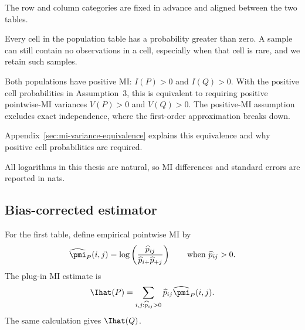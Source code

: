 \begin{assumption}
The row and column categories are fixed in advance and aligned between the two
tables.
\end{assumption}

\begin{assumption}
Every cell in the population table has a probability greater than zero. A
sample can still contain no observations in a cell, especially when that cell
is rare, and we retain such samples.
\end{assumption}

\begin{assumption}[Positive MI]
Both populations have positive MI: \(I(P)>0\) and \(I(Q)>0\). With the positive
cell probabilities in Assumption~3, this is equivalent to requiring positive
pointwise-MI variances \(V(P)>0\) and \(V(Q)>0\). The positive-MI
assumption excludes exact independence, where the first-order approximation
breaks down.
\end{assumption}

Appendix~\ref{sec:mi-variance-equivalence} explains this equivalence and
why positive cell probabilities are required.

All logarithms in this thesis are natural, so MI differences and standard
errors are reported in nats.

\subsection{Bias-corrected estimator}

For the first table, define empirical pointwise MI by
\begin{equation}
  \widehat\pmi_P(i,j)
  =\log\left(
  \frac{\widehat p_{ij}}
       {\widehat p_{i+}\widehat p_{+j}}
  \right)
  \qquad\text{when }\widehat p_{ij}>0.
  \label{eq:empirical-pmi}
\end{equation}
The plug-in MI estimate is
\begin{equation}
  \Ihat(P)
  =\sum_{i,j:\widehat p_{ij}>0}
  \widehat p_{ij}\widehat\pmi_P(i,j).
  \label{eq:plugin-mi}
\end{equation}
The same calculation gives \(\Ihat(Q)\).

